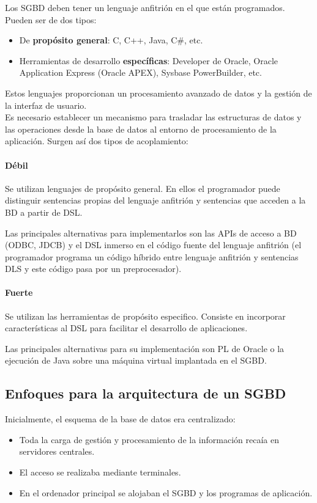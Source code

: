 \documentclass[12pt,spanish]{article}
\numberwithin{definition}{subsection}
\begin{document}
Los SGBD deben tener un lenguaje anfitrión en el que están programados. Pueden ser de dos tipos:

\begin{itemize}
	\item De \textbf{propósito general}: C, C++, Java, C\#, etc.
	\item Herramientas de desarrollo \textbf{específicas}: Developer de Oracle, Oracle Application Express (Oracle APEX), Sysbase PowerBuilder, etc.
\end{itemize}

Estos lenguajes proporcionan un procesamiento avanzado de datos y la gestión de la interfaz de usuario.\\

Es necesario establecer un mecanismo para trasladar las estructuras de datos y las operaciones desde la base de datos al entorno de procesamiento de la aplicación. Surgen así dos tipos de acoplamiento:

\paragraph{Débil}
Se utilizan lenguajes de propósito general. En ellos el programador puede distinguir sentencias propias del lenguaje anfitrión y sentencias que acceden a la BD a partir de DSL.

Las principales alternativas para implementarlos son las APIs de acceso a BD (ODBC, JDCB) y el DSL inmerso en el código fuente del lenguaje anfitrión (el programador programa un código híbrido entre lenguaje anfitrión y sentencias DLS y este código pasa por un preprocesador).
\paragraph{Fuerte}

Se utilizan las herramientas de propósito especifico. Consiste en incorporar características al DSL para facilitar el desarrollo de aplicaciones.

Las principales alternativas para su implementación son PL de Oracle o la ejecución de Java sobre una máquina virtual implantada en el SGBD.

\subsection{Enfoques para la arquitectura de un SGBD}

Inicialmente, el esquema de la base de datos era centralizado:
\begin{itemize}
	\item Toda la carga de gestión y procesamiento de la información recaía en servidores centrales.
	\item El acceso se realizaba mediante terminales.
	\item En el ordenador principal se alojaban el SGBD y los programas de aplicación.
\end{itemize}
\end{document}
